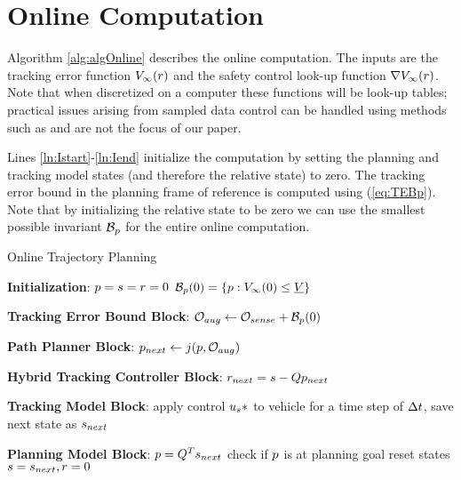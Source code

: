 \section{Online Computation \label{sec:online}}

Algorithm \ref{alg:algOnline} describes the online computation. The inputs are the tracking error function $V_\infty(r)$ and the safety control look-up function $\nabla V_\infty(r)$. Note that when discretized on a computer these functions will be look-up tables; practical issues arising from sampled data control can be handled using methods such as \cite{Mitchell2012, Mitchell13, Dabadie2014} and are not the focus of our paper.

Lines \ref{ln:Istart}-\ref{ln:Iend} initialize the computation by setting the planning and tracking model states (and therefore the relative state) to zero. The tracking error bound in the planning frame of reference is computed using (\ref{eq:TEBp}). Note that by initializing the relative state to be zero we can use the smallest possible invariant $\mathcal B_p$ for the entire online computation. 
\begin{algorithm}	
	\caption{Online Trajectory Planning}
	\label{alg:algOnline}
	\begin{algorithmic}[1]
		\STATE \textbf{Initialization}: \label{ln:Istart}
		\STATE $p = s = r = 0$
		\STATE $\mathcal B_p(0) = \{p: V_\infty(0) \le \underline{V}\}$ \label{ln:Iend}
		
		\STATE \textbf{Tracking Error Bound Block}: \label{ln:obsStart}
		\STATE $\mathcal{O}_{aug} \leftarrow \mathcal{O}_{sense} + \mathcal B_p(0)$ \label{ln:obsEnd}
		
		\STATE \textbf{Path Planner Block}:\label{ln:plannerStart}
		\STATE $p_{next} \leftarrow j(p, \mathcal{O}_{aug})$\label{ln:plannerEnd}
		
		\STATE \textbf{Hybrid Tracking Controller Block}:\label{ln:controllerStart}
		\STATE $r_{next} = s - Qp_{next}$
		
		\ELSE {} \ENDIF \label{ln:controllerEnd}
		
		\STATE \textbf{Tracking Model Block}: \label{ln:trackingStart}
		\STATE apply control $u_s*$ to vehicle for a time step of $\Delta t$, save next state as $s_{next}$ \label{ln:trackingEnd}
		
		\STATE \textbf{Planning Model Block}:\label{ln:planningStart}
		\STATE $p = Q^Ts_{next}$
		\STATE check if $p$ is at planning goal
		\STATE reset states $s = s_{next}, r = 0$ \label{ln:planningEnd}
		\ENDWHILE
	\end{algorithmic}
\end{algorithm}
